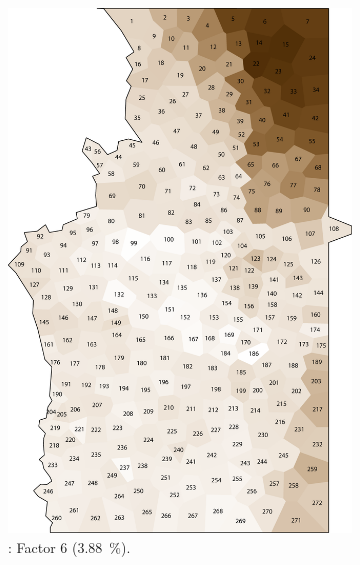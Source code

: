 \documentclass[output=paper]{LSP/langsci}
\begin{document}
\begin{figure}
\begin{subfigure}[t]{0.3\textwidth}
\includegraphics[width=\textwidth]{illustrations/pickl_fig7}
\caption{: Factor 6 (3.88~\%).}
\label{fig:7}
\end{subfigure}  
~
\begin{subfigure}[t]{0.3\textwidth}

\end{subfigure}
\end{figure}
\end{document}
